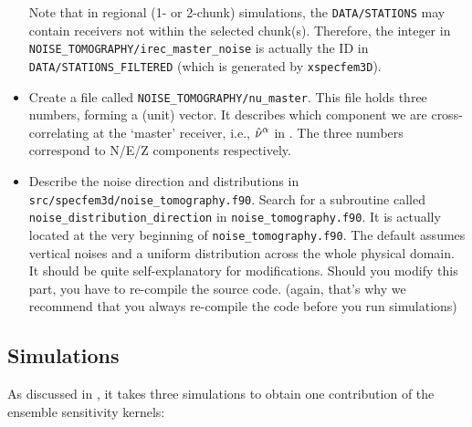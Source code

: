 \documentclass[oneside,english]{book}
\begin{document}
\begin{itemize}
Note that in regional (1- or 2-chunk) simulations, the \texttt{DATA/STATIONS}
may contain receivers not within the selected chunk(s).
Therefore, the integer in \texttt{NOISE\_TOMOGRAPHY/irec\_master\_noise}
is actually the ID in \texttt{DATA/STATIONS\_FILTERED} (which is generated by \texttt{xspecfem3D}).

\item
Create a file called \texttt{NOISE\_TOMOGRAPHY/nu\_master}. This file holds three numbers,
forming a (unit) vector. It describes which component we are cross-correlating at the `master'
receiver, i.e., ${\hat{\bf \nu}}^{\alpha}$ in \citet{trompetal2010}. The three numbers correspond to
N/E/Z components respectively.

\item
Describe the noise direction and distributions in \texttt{src/specfem3d/noise\_tomography.f90}.
Search for a subroutine called \texttt{noise\_distribution\_direction}
in \texttt{noise\_tomography.f90}. It is actually located at the very beginning
of \texttt{noise\_tomography.f90}. The default assumes vertical noises and a uniform distribution
across the whole physical domain. It should be quite self-explanatory for modifications.
Should you modify this part, you have to re-compile the source code. (again, that's why we recommend
that you always re-compile the code before you run simulations)

\end{itemize}

\subsection{Simulations}

As discussed in \citet{trompetal2010}, it takes three simulations to obtain one contribution
of the ensemble sensitivity kernels:
\end{document}

